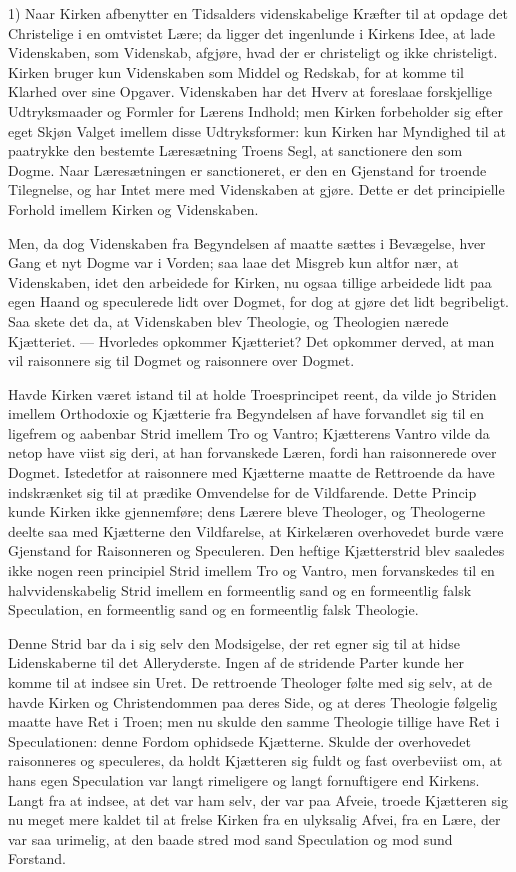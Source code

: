 \documentclass[12pt,a4paper]{book}
\newcommand{\opage}[1]{\marginnote{\footnotesize\textit{[#1]}}}
\begin{document}
1) Naar Kirken afbenytter en Tidsalders videnskabelige Kræfter til at opdage
det Christelige i en omtvistet Lære; da ligger det ingenlunde i Kirkens Idee,
at lade Videnskaben, som Videnskab, afgjøre, hvad der er christeligt og ikke
christeligt. Kirken bruger kun Videnskaben som Middel og Redskab, for at komme
til Klarhed over sine Opgaver. Videnskaben har det Hverv at foreslaae
forskjellige Udtryksmaader og Formler for Lærens Indhold; men Kirken
forbeholder sig efter eget Skjøn Valget imellem disse Udtryksformer: kun Kirken
har Myndighed til at paatrykke den bestemte Læresætning Troens Segl, at
sanctionere den som Dogme. Naar Læresætningen er sanctioneret, er den en
Gjenstand for troende Tilegnelse, og har Intet mere med Videnskaben at gjøre.
Dette er det principielle Forhold imellem Kirken og Videnskaben.

Men, da dog Videnskaben fra Begyndelsen af maatte sættes i Bevægelse, hver
Gang et nyt Dogme var i Vorden; saa laae det Misgreb kun altfor nær, at
Videnskaben, idet den arbeidede for Kirken, nu ogsaa tillige arbeidede lidt paa
egen Haand og speculerede lidt over Dogmet, for dog at gjøre det lidt
begribeligt. Saa skete det da, at Videnskaben blev Theologie, og Theologien
nærede Kjætteriet. --- Hvorledes opkommer Kjætteriet? Det opkommer derved, at
man vil raisonnere sig til Dogmet og raisonnere over Dogmet.

Havde Kirken været istand til at holde Troesprincipet reent, da vilde jo
Striden imellem Orthodoxie og Kjætterie fra Begyndelsen af have forvandlet sig
til en ligefrem og aabenbar Strid imellem Tro og Vantro; Kjætterens Vantro
vilde da netop
\opage{116} have viist sig deri, at han forvanskede Læren, fordi han raisonnerede over
Dogmet. Istedetfor at raisonnere med Kjætterne maatte de Rettroende da have
indskrænket sig til at prædike Omvendelse for de Vildfarende. Dette Princip
kunde Kirken ikke gjennemføre; dens Lærere bleve Theologer, og Theologerne
deelte saa med Kjætterne den Vildfarelse, at Kirkelæren overhovedet burde være
Gjenstand for Raisonneren og Speculeren. Den heftige Kjætterstrid blev saaledes
ikke nogen reen principiel Strid imellem Tro og Vantro, men forvanskedes til en
halvvidenskabelig Strid imellem en formeentlig sand og en formeentlig falsk
Speculation, en formeentlig sand og en formeentlig falsk Theologie.

Denne Strid bar da i sig selv den Modsigelse, der ret egner sig til at hidse
Lidenskaberne til det Alleryderste. Ingen af de stridende Parter kunde her
komme til at indsee sin Uret. De rettroende Theologer følte med sig selv, at de
havde Kirken og Christendommen paa deres Side, og at deres Theologie følgelig
maatte have Ret i Troen; men nu skulde den samme Theologie tillige have Ret i
Speculationen: denne Fordom ophidsede Kjætterne. Skulde der overhovedet
raisonneres og speculeres, da holdt Kjætteren sig fuldt og fast overbeviist om,
at hans egen Speculation var langt rimeligere og langt fornuftigere end
Kirkens. Langt fra at indsee, at det var ham selv, der var paa Afveie, troede
Kjætteren sig nu meget mere kaldet til at frelse Kirken fra en ulyksalig Afvei,
fra en Lære, der var saa urimelig, at den baade stred mod sand Speculation og
mod sund Forstand.
\end{document}
